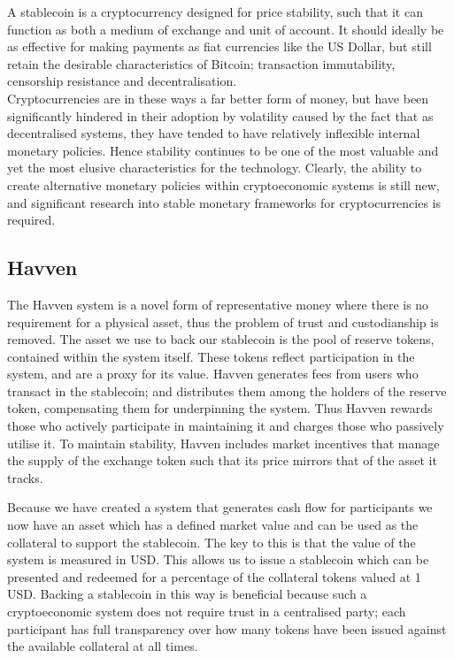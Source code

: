 \noindent A stablecoin is a cryptocurrency designed for price stability, such that it can function as
both a medium of exchange and unit of account. It should ideally be as effective for making payments
as fiat currencies like the US Dollar, but still retain the desirable characteristics of Bitcoin;
transaction immutability, censorship resistance and decentralisation. \\

\noindent Cryptocurrencies are in these ways a far better form of money, but have been significantly hindered
in their adoption by volatility caused by the fact that as decentralised systems, they have tended to have relatively inflexible internal
monetary policies. Hence stability continues to be one of the most valuable and yet the most elusive
characteristics for the technology. Clearly, the ability to create alternative monetary policies within
cryptoeconomic systems is still new, and significant research into stable monetary
frameworks for cryptocurrencies is required.

\subsection{Havven}

\noindent The Havven system is a novel form of representative money where there is no requirement for a physical
asset, thus the problem of trust and custodianship is removed. The asset we use to back our stablecoin is 
the pool of reserve tokens, contained within the system itself. These tokens reflect participation in the system,
and are a proxy for its value. Havven generates fees from users who transact in the stablecoin;
and distributes them among the holders of the reserve token, compensating them for underpinning the system.
Thus Havven rewards those who actively participate in maintaining it and charges those who passively utilise it.
To maintain stability, Havven includes market incentives that manage the supply of the exchange token such that
its price mirrors that of the asset it tracks.

\noindent Because we have created a system that generates cash flow for participants we now have an asset which has a defined market
value and can be used as the collateral to support the stablecoin. The key to this is that the value of the
system is measured in USD. This allows us to issue a stablecoin which can be presented and redeemed for a
percentage of the collateral tokens valued at 1 USD. Backing a stablecoin in this way is beneficial because
such a cryptoeconomic system does not require trust in a centralised party; each participant has full
transparency over how many tokens have been issued against the available collateral at all times. \\

